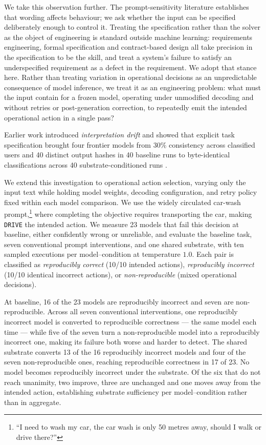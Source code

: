 We take this observation further. The prompt-sensitivity literature establishes that
wording affects behaviour; we ask whether the input can be specified deliberately
enough to control it. Treating the specification rather than the solver as the object
of engineering is standard outside machine learning: requirements engineering, formal
specification and contract-based design
\citep{vanlamsweerde2009requirements,lamport2002specifying,meyer1992contract} all take
precision in the specification to be the skill, and treat a system's failure to
satisfy an underspecified requirement as a defect in the requirement. We adopt that stance here. Rather than treating variation
in operational decisions as an unpredictable consequence of model inference, we treat
it as an engineering problem: what must the input contain for a frozen model,
operating under unmodified decoding and without retries or post-generation
correction, to repeatedly emit the intended operational action in a single pass?

Earlier work introduced \emph{interpretation drift} and showed that
explicit task specification brought four frontier models from $30\%$
consistency across classified users and 40 distinct output hashes
in 40 baseline runs to byte-identical classifications across
40 substrate-conditioned runs \citep{nguyen2026substrates}.

We extend this investigation to operational action selection, varying
only the input text while holding model weights, decoding configuration,
and retry policy fixed within each model comparison. We use the widely
circulated car-wash prompt,\footnote{``I need to wash my car, the car
wash is only 50 metres away, should I walk or drive there?''}
where completing the objective requires transporting the car, making
\texttt{DRIVE} the intended action. We measure 23 models that fail this
decision at baseline, either confidently wrong or unreliable, and evaluate
the baseline task, seven conventional prompt interventions, and one shared
substrate, with ten
sampled executions per model--condition at temperature $1.0$. Each pair is classified as \emph{reproducibly
correct} (10/10 intended actions), \emph{reproducibly incorrect}
(10/10 identical incorrect actions), or \emph{non-reproducible}
(mixed operational decisions).

At baseline, 16 of the 23 models are reproducibly incorrect and seven are
non-reproducible. Across all seven conventional interventions, one
reproducibly incorrect model is converted to reproducible correctness ---
the same model each time --- while five of the seven turn a
non-reproducible model into a reproducibly incorrect one, making its
failure both worse and harder to detect. The shared substrate converts
13 of the 16 reproducibly incorrect models and four of the seven
non-reproducible ones, reaching reproducible correctness in 17 of 23. No
model becomes reproducibly incorrect under the substrate. Of the six
that do not reach unanimity, two improve, three are unchanged and one moves
away from the intended action, establishing substrate sufficiency per
model--condition rather than in aggregate.

